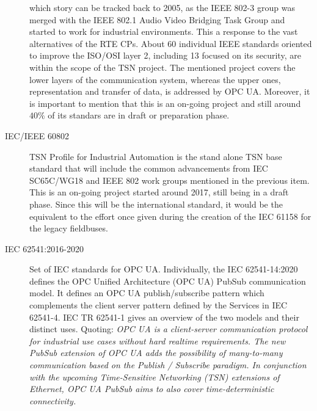 \begin{description}
        which story can be tracked back to 2005, as the IEEE 802-3 group was merged with the IEEE 802.1 Audio Video Bridging Task Group and started to work for
        industrial environments. This a response to the vast alternatives of the RTE CPs. About 60 individual IEEE standards oriented to improve
        the ISO/OSI layer 2, including 13 focused on its security, are within the scope of the TSN project. \cite{future_iiot} %
        The mentioned project covers the lower layers of the communication system, whereas the upper ones, representation and transfer of data, is
        addressed by OPC UA. Moreover, it is important to mention that this is an on-going project and still around $40\%$ of its standars are
        in draft or preparation phase.\cite{tsn_homepage}
    \item[IEC/IEEE 60802] TSN Profile for Industrial Automation is the stand alone TSN base standard that will include the common advancements
        from IEC SC65C/WG18 and IEEE 802 work groups mentioned in the previous item.\cite{tsn_profile}%
        This is an on-going project started around 2017, still being in a draft phase. Since this will be the international standard, it would be 
        the equivalent to the effort once given during the creation of the IEC 61158 for the legacy fieldbuses.
    \item[IEC 62541:2016-2020] Set of IEC standards for OPC UA. Individually, the IEC 62541-14:2020 defines the OPC Unified Architecture 
        (OPC UA) PubSub communication model. It defines an OPC UA publish/subscribe pattern which complements the client server pattern defined 
        by the Services in IEC 62541-4. IEC TR 62541-1 gives an overview of the two models and their distinct uses.\cite{opcua_standard} %
        Quoting: \emph{OPC UA is a client-server communication protocol for industrial use cases without hard realtime requirements. The new PubSub 
        extension of OPC UA adds the possibility of many-to-many communication based on the Publish / Subscribe paradigm. 
        In conjunction with the upcoming Time-Sensitive Networking (TSN) extensions of Ethernet, OPC UA PubSub aims to also cover 
        time-deterministic connectivity.}\cite{opc_tsn_application} %
\end{description}





